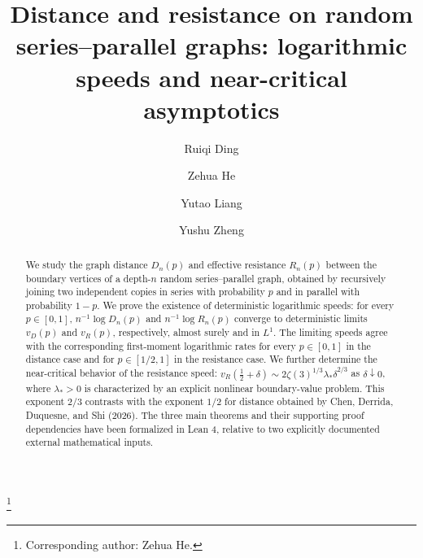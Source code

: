 \documentclass[12pt]{amsart}
\numberwithin{equation}{section}
\theoremstyle{plain}
\theoremstyle{definition}
\begin{document}
\title[Distance and resistance on random series--parallel graphs]{Distance and resistance on random series--parallel graphs:
logarithmic speeds and near-critical asymptotics}
\author[Ding et~al.]{Ruiqi Ding}
\address{State Key Laboratory of Mathematical Sciences, Academy of Mathematics and
Systems Science, Chinese Academy of Sciences, Beijing 100190, China; School of
Mathematical Sciences, University of Chinese Academy of Sciences, Beijing 100049, China}
\author[]{Zehua He}
\address{State Key Laboratory of Mathematical Sciences, Academy of Mathematics and
Systems Science, Chinese Academy of Sciences, Beijing 100190, China; School of
Mathematical Sciences, University of Chinese Academy of Sciences, Beijing 100049, China}
\thanks{Corresponding author: Zehua He.}
\author[]{Yutao Liang}
\address{State Key Laboratory of Mathematical Sciences, Academy of Mathematics and
Systems Science, Chinese Academy of Sciences, Beijing 100190, China; School of
Mathematical Sciences, University of Chinese Academy of Sciences, Beijing 100049, China}
\author[]{Yushu Zheng}
\address{School of Mathematics, Shanghai University of Finance and Economics,
Shanghai 200433, China}
\begin{abstract}
We study the graph distance $D_n(p)$ and effective resistance
$R_n(p)$ between the boundary vertices of a depth-$n$ random series--parallel
graph, obtained by recursively joining two independent copies in series with
probability $p$ and in parallel with probability $1-p$. We prove the
existence of deterministic logarithmic speeds: for every $p\in[0,1]$,
$n^{-1}\log D_n(p)$ and $n^{-1}\log R_n(p)$ converge to deterministic limits
$v_D(p)$ and $v_R(p)$, respectively, almost surely and in $L^1$. The
limiting speeds agree with the corresponding first-moment logarithmic rates
for every $p\in[0,1]$ in the distance case and for $p\in[1/2,1]$ in the
resistance case.
We further determine the near-critical behavior of the resistance speed:
$v_R(\frac12+\delta)\sim
2\zeta(3)^{1/3}\lambda_*\delta^{2/3}$ as $\delta\downarrow0$, where
$\lambda_*>0$ is characterized by an explicit nonlinear boundary-value
problem. This exponent $2/3$ contrasts with the exponent $1/2$ for distance
obtained by Chen, Derrida, Duquesne, and Shi (2026). The three main theorems and their supporting proof dependencies have been formalized in Lean 4, relative to two explicitly documented external mathematical inputs.
\end{abstract}
\end{document}
